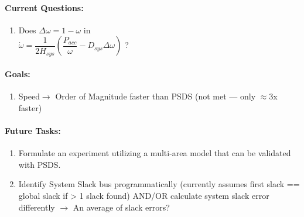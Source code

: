 \documentclass[12pt]{article}
\begin{document}
\begin{multicols}{2}
\begin{enumerate}
	\end{enumerate}

	\paragraph{Current Questions:}
	\begin{enumerate}
	\item Does $\Delta \omega=1-\omega$ in \\ $\dot{\omega}=\dfrac{1}{2H_{sys}}\left(\dfrac{P_{acc}}{\omega} - D_{sys}\Delta \omega \right)$ ?
		


		
		
	\end{enumerate}
\paragraph{Goals:}
	\begin{enumerate}
	\item Speed$\longrightarrow$ Order of Magnitude faster than PSDS (not met --- only $\approx$3x faster)
	\end{enumerate}

\vfill\null
\columnbreak

\paragraph{Future Tasks:} %
	\begin{enumerate}
		\item Formulate an experiment utilizing a multi-area model that can be validated with PSDS.
		\item Identify System Slack bus programmatically (currently assumes first slack == global slack if > 1 slack found)
		\subitem AND/OR calculate system slack error differently $\rightarrow$ An average of slack errors?


\end{enumerate}
\end{multicols}
\end{document}

